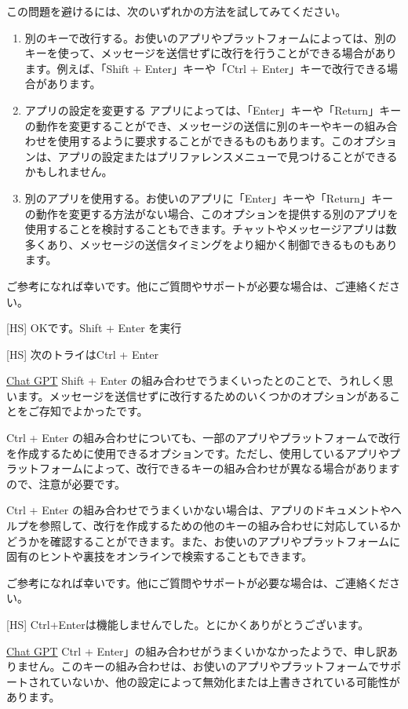 \documentclass[
]{book}
\theoremstyle{definition}
\theoremstyle{definition}
\theoremstyle{definition}
\theoremstyle{definition}
\theoremstyle{remark}
\begin{document}
この問題を避けるには、次のいずれかの方法を試してみてください。

\begin{enumerate}
\def\labelenumi{\arabic{enumi}.}
\item
  別のキーで改行する。お使いのアプリやプラットフォームによっては、別のキーを使って、メッセージを送信せずに改行を行うことができる場合があります。例えば、「Shift + Enter」キーや「Ctrl + Enter」キーで改行できる場合があります。
\item
  アプリの設定を変更する アプリによっては、「Enter」キーや「Return」キーの動作を変更することができ、メッセージの送信に別のキーやキーの組み合わせを使用するように要求することができるものもあります。このオプションは、アプリの設定またはプリファレンスメニューで見つけることができるかもしれません。
\item
  別のアプリを使用する。お使いのアプリに「Enter」キーや「Return」キーの動作を変更する方法がない場合、このオプションを提供する別のアプリを使用することを検討することもできます。チャットやメッセージアプリは数多くあり、メッセージの送信タイミングをより細かく制御できるものもあります。
\end{enumerate}

ご参考になれば幸いです。他にご質問やサポートが必要な場合は、ご連絡ください。

{[}HS{]} OKです。Shift + Enter を実行

{[}HS{]} 次のトライはCtrl + Enter

\protect\hyperlink{chatgpt}{Chat GPT} Shift + Enter の組み合わせでうまくいったとのことで、うれしく思います。メッセージを送信せずに改行するためのいくつかのオプションがあることをご存知でよかったです。

Ctrl + Enter の組み合わせについても、一部のアプリやプラットフォームで改行を作成するために使用できるオプションです。ただし、使用しているアプリやプラットフォームによって、改行できるキーの組み合わせが異なる場合がありますので、注意が必要です。

Ctrl + Enter の組み合わせでうまくいかない場合は、アプリのドキュメントやヘルプを参照して、改行を作成するための他のキーの組み合わせに対応しているかどうかを確認することができます。また、お使いのアプリやプラットフォームに固有のヒントや裏技をオンラインで検索することもできます。

ご参考になれば幸いです。他にご質問やサポートが必要な場合は、ご連絡ください。

{[}HS{]} Ctrl+Enterは機能しませんでした。とにかくありがとうございます。

\protect\hyperlink{chatgpt}{Chat GPT} Ctrl + Enter」の組み合わせがうまくいかなかったようで、申し訳ありません。このキーの組み合わせは、お使いのアプリやプラットフォームでサポートされていないか、他の設定によって無効化または上書きされている可能性があります。
\end{document}
